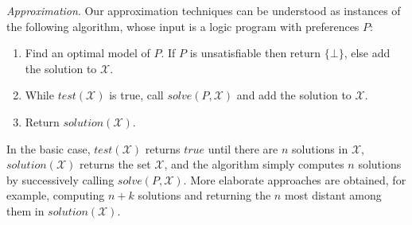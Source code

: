 \documentclass[a4paper,UKenglish]{oasics}
\newcommand{\mysubparagraph}[1]{\par\textit{#1}}
\begin{document}
%
%
%
%
%
%
%
%
%
%
%
%
%
%
%

\mysubparagraph{Approximation}.
%
Our approximation techniques can be understood as instances of the following algorithm,
whose input is a logic program with preferences $P$:
%
%
%
\begin{enumerate}%
\item
Find an optimal model of  $P$. If $P$ is unsatisfiable then return $\{\bot\}$, else add the solution to $\mathcal{X}$.
\item
While $\mathit{test}(\mathcal{X})$ is true, call $\mathit{solve}(P,\mathcal{X})$ and add the solution to $\mathcal{X}$.
\item
Return $\mathit{solution}(\mathcal{X})$.
\end{enumerate}
%
In the basic case,
$\mathit{test}(\mathcal{X})$ returns $\mathit{true}$ until there are $n$ solutions in $\mathcal{X}$, 
$\mathit{solution}(\mathcal{X})$ returns the set $\mathcal{X}$,
and the algorithm simply computes $n$ solutions by successively calling $\mathit{solve}(P,\mathcal{X})$.
More elaborate approaches are obtained, for example, computing $n+k$ solutions 
and returning the $n$ most distant among them in $\mathit{solution(\mathcal{X})}$.
\end{document}
